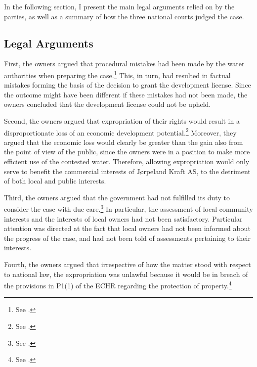 In the following section, I present the main legal arguments relied on by the parties, as well as a summary of how the three national courts judged the case.

\subsection{Legal Arguments}\label{view}

First, the owners argued that procedural mistakes had been made by the water authorities when preparing the case.\footnote{See \cite[12]{jorpeland09}.} This, in turn, had resulted in factual mistakes forming the basis of the decision to grant the development license. Since the outcome might have been different if these mistakes had not been made, the owners concluded that the development license could not be upheld.

Second, the owners argued that expropriation of their rights would result in a disproportionate loss of an economic development potential.\footnote{See \cite[5]{jorpeland11a}.} Moreover, they argued that the economic loss would clearly be greater than the gain also from the point of view of the public, since the owners were in a position to make more efficient use of the contested water. Therefore, allowing expropriation would only serve to benefit the commercial interests of Jørpeland Kraft AS, to the detriment of both local and public interests.

Third, the owners argued that the government had not fulfilled its duty to consider the case with due care.\footnote{See \cite[12]{jorpeland09}.} In particular, the assessment of local community interests and the interests of local owners had not been satisfactory. Particular attention was directed at the fact that local owners had not been informed about the progress of the case, and had not been told of assessments pertaining to their interests.

Fourth, the owners argued that irrespective of how the matter stood with respect to national law, the expropriation was unlawful because it would be in breach of the provisions in P1(1) of the ECHR regarding the protection of property.\footnote{See \cite[07-08]{jorpeland09}.}

